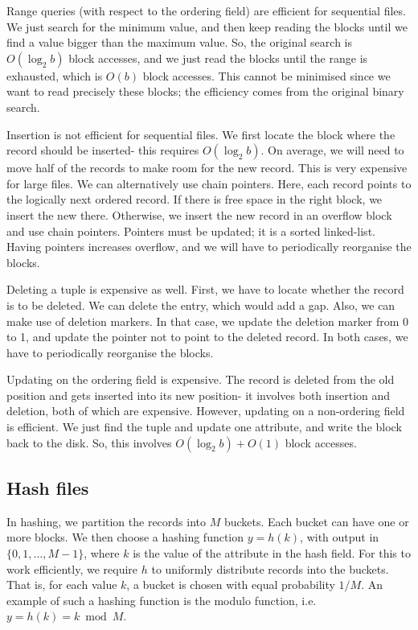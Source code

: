 \documentclass[a4paper, openany]{memoir}
\begin{document}

Range queries (with respect to the ordering field) are efficient for sequential files. We just search for the minimum value, and then keep reading the blocks until we find a value bigger than the maximum value. So, the original search is $O(\log_2 b)$ block accesses, and we just read the blocks until the range is exhausted, which is $O(b)$ block accesses. This cannot be minimised since we want to read precisely these blocks; the efficiency comes from the original binary search.

Insertion is not efficient for sequential files. We first locate the block where the record should be inserted- this requires $O(\log_2 b)$. On average, we will need to move half of the records to make room for the new record. This is very expensive for large files. We can alternatively use chain pointers. Here, each record points to the logically next ordered record. If there is free space in the right block, we insert the new there. Otherwise, we insert the new record in an overflow block and use chain pointers. Pointers must be updated; it is a sorted linked-list. Having pointers increases overflow, and we will have to periodically reorganise the blocks.

Deleting a tuple is expensive as well. First, we have to locate whether the record is to be deleted. We can delete the entry, which would add a gap. Also, we can make use of deletion markers. In that case, we update the deletion marker from 0 to 1, and update the pointer not to point to the deleted record. In both cases, we have to periodically reorganise the blocks.

Updating on the ordering field is expensive. The record is deleted from the old position and gets inserted into its new position- it involves both insertion and deletion, both of which are expensive. However, updating on a non-ordering field is efficient. We just find the tuple and update one attribute, and write the block back to the disk. So, this involves $O(\log_2 b) + O(1)$ block accesses.

\subsection{Hash files}
In hashing, we partition the records into $M$ buckets. Each bucket can have one or more blocks. We then choose a hashing function $y = h(k)$, with output in $\{0, 1, \dots, M-1\}$, where $k$ is the value of the attribute in the hash field. For this to work efficiently, we require $h$ to uniformly distribute records into the buckets. That is, for each value $k$, a bucket is chosen with equal probability $1/M$. An example of such a hashing function is the modulo function, i.e. $y = h(k) = k \bmod{M}$.
\end{document}
